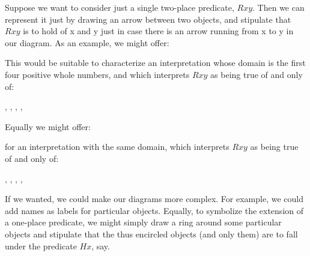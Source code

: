 
Suppose we want to consider just a single two-place predicate, $Rxy$. Then we can represent it just by drawing an arrow between two objects, and stipulate that $Rxy$ is to hold of x and y just in case there is an arrow running from x to y in our diagram. As an example, we might offer:
\begin{center}
\end{center}
This would be suitable to characterize an interpretation whose domain is the first four positive whole numbers, and which interprets $Rxy$ as being true of and only of:
	\begin{center}
		,
		,
		,
		,
	\end{center}
Equally we might offer:

\begin{center}
\end{center}
for an interpretation with the same domain, which interprets $Rxy$ as being true of and only of:
	\begin{center}
		,
		,
		,
		,
	\end{center}
If we wanted, we could make our diagrams more complex. For example, we could add names as labels for particular objects. Equally, to symbolize the extension of a one-place predicate, we might simply draw a ring around some particular objects and stipulate that the thus encircled objects (and only them) are to fall under the predicate $Hx$, say.


